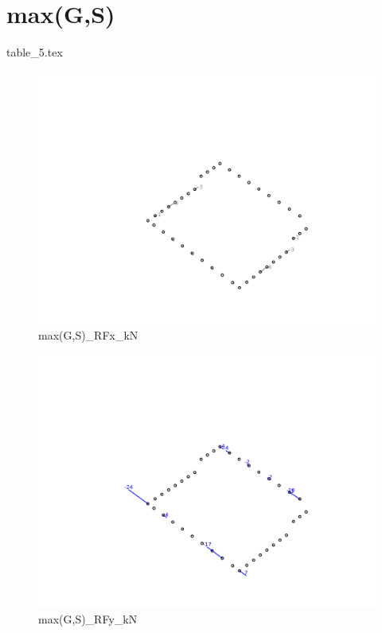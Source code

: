 
    \section{max(G,S)}
    {table_5.tex}

    \begin{figure}[H] %
        \centering %
        \includegraphics[width=\textwidth]{assets/img/graph3D_charges_cas_5_RFx_kN.png} %
        \caption{max(G,S)\_RFx\_kN} %
    \end{figure}

    \begin{figure}[H] %
        \centering %
        \includegraphics[width=\textwidth]{assets/img/graph3D_charges_cas_5_RFy_kN.png} %
        \caption{max(G,S)\_RFy\_kN} %
    \end{figure}

